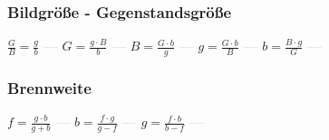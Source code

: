 \subsubsection{Bildgröße - Gegenstandsgröße} 
\begin{minipage}{0.45\textwidth} 
\end{minipage} 
\begin{minipage}{0.45\textwidth} 
 
\end{minipage} 
$ \frac{G}{B} = \frac{g}{b} $ \textcolor{lightgray}{\textbf{---}} 
$ G = \frac{g\cdot B}{ b} $ \textcolor{lightgray}{\textbf{---}} 
$ B = \frac{G\cdot b}{ g} $ \textcolor{lightgray}{\textbf{---}} 
$ g = \frac{G\cdot b}{ B} $ \textcolor{lightgray}{\textbf{---}} 
$ b = \frac{B\cdot g}{ G} $ \textcolor{lightgray}{\textbf{---}} 

\subsubsection{Brennweite} 
\begin{minipage}{0.45\textwidth} 
\end{minipage} 
\begin{minipage}{0.45\textwidth} 
 
\end{minipage} 
$ f  = \frac{g\cdot b}{g+b} $ \textcolor{lightgray}{\textbf{---}} 
$ b  = \frac{f\cdot g}{g-f} $ \textcolor{lightgray}{\textbf{---}} 
$ g  = \frac{f\cdot b}{b-f} $ \textcolor{lightgray}{\textbf{---}} 

